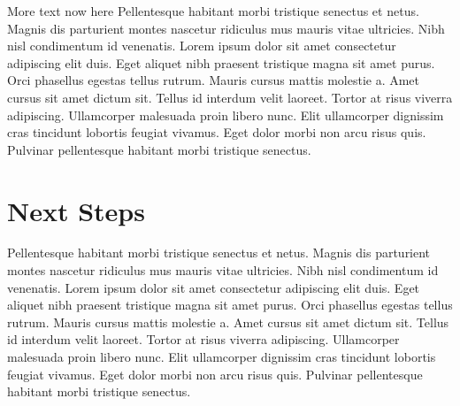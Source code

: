 \documentclass[article,30pt,extrafontsizes]{memoir}
\begin{document}
\begin{multicols*}{3}
{More text now here Pellentesque habitant morbi tristique senectus et
netus. Magnis dis parturient montes nascetur ridiculus mus mauris vitae
ultricies. Nibh nisl condimentum id venenatis. Lorem ipsum dolor sit
amet consectetur adipiscing elit duis. Eget aliquet nibh praesent
tristique magna sit amet purus. Orci phasellus egestas tellus rutrum.
Mauris cursus mattis molestie a. Amet cursus sit amet dictum sit. Tellus
id interdum velit laoreet. Tortor at risus viverra adipiscing.
Ullamcorper malesuada proin libero nunc. Elit ullamcorper dignissim cras
tincidunt lobortis feugiat vivamus. Eget dolor morbi non arcu risus
quis. Pulvinar pellentesque habitant morbi tristique senectus.

\section{Next Steps}\label{next-steps}

Pellentesque habitant morbi tristique senectus et netus. Magnis dis
parturient montes nascetur ridiculus mus mauris vitae ultricies. Nibh
nisl condimentum id venenatis. Lorem ipsum dolor sit amet consectetur
adipiscing elit duis. Eget aliquet nibh praesent tristique magna sit
amet purus. Orci phasellus egestas tellus rutrum. Mauris cursus mattis
molestie a. Amet cursus sit amet dictum sit. Tellus id interdum velit
laoreet. Tortor at risus viverra adipiscing. Ullamcorper malesuada proin
libero nunc. Elit ullamcorper dignissim cras tincidunt lobortis feugiat
vivamus. Eget dolor morbi non arcu risus quis. Pulvinar pellentesque
habitant morbi tristique senectus.
\printbibliography
}
\end{multicols*}

\end{document}
